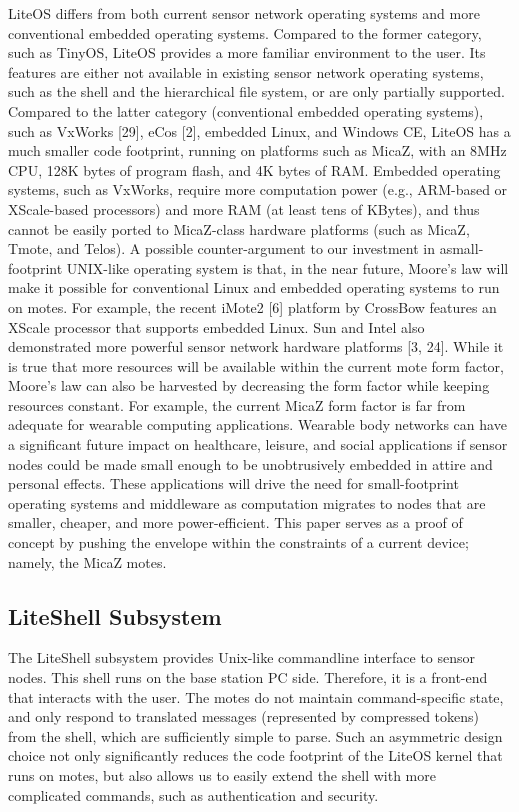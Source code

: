 LiteOS differs from both current sensor network operating systems and more conventional embedded operating
systems. Compared to the former category, such as TinyOS,
LiteOS provides a more familiar environment to the user. Its
features are either not available in existing sensor network
operating systems, such as the shell and the hierarchical file
system, or are only partially supported. Compared to the
latter category (conventional embedded operating systems),
such as VxWorks [29], eCos [2], embedded Linux, and
Windows CE, LiteOS has a much smaller code footprint,
running on platforms such as MicaZ, with an 8MHz CPU,
128K bytes of program flash, and 4K bytes of RAM. Embedded operating systems, such as VxWorks, require more
computation power (e.g., ARM-based or XScale-based processors) and more RAM (at least tens of KBytes), and thus
cannot be easily ported to MicaZ-class hardware platforms
(such as MicaZ, Tmote, and Telos).
A possible counter-argument to our investment in asmall-footprint UNIX-like operating system is that, in the
near future, Moore’s law will make it possible for conventional Linux and embedded operating systems to run on
motes. For example, the recent iMote2 [6] platform by
CrossBow features an XScale processor that supports embedded Linux. Sun and Intel also demonstrated more powerful sensor network hardware platforms [3, 24]. While it is
true that more resources will be available within the current
mote form factor, Moore’s law can also be harvested by decreasing the form factor while keeping resources constant.
For example, the current MicaZ form factor is far from adequate for wearable computing applications. Wearable body
networks can have a significant future impact on healthcare, leisure, and social applications if sensor nodes could
be made small enough to be unobtrusively embedded in attire and personal effects. These applications will drive the
need for small-footprint operating systems and middleware
as computation migrates to nodes that are smaller, cheaper,
and more power-efficient. This paper serves as a proof of
concept by pushing the envelope within the constraints of a
current device; namely, the MicaZ motes.



\subsection{LiteShell Subsystem}
The LiteShell subsystem provides Unix-like commandline interface to sensor nodes. This shell runs on the base
station PC side. Therefore, it is a front-end that interacts
with the user. The motes do not maintain command-specific
state, and only respond to translated messages (represented
by compressed tokens) from the shell, which are sufficiently
simple to parse. Such an asymmetric design choice not only
significantly reduces the code footprint of the LiteOS kernel
that runs on motes, but also allows us to easily extend the
shell with more complicated commands, such as authentication and security.



